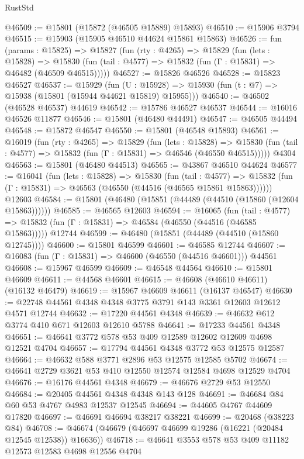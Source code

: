 \begin{lexlean}{RustStd}
\begin{coremodule}
@46509 := @15801 (@15872 (@46505 @15889) @15893)
@46510 := @15906 @3794
@46515 := @15903 (@15905 @46510 @44624 @15861 @15863)
@46526 := fun (params : @15825) =>
  @15827
    (fun (rty : @4265) =>
    @15829
      (fun (lets : @15828) =>
      @15830 (fun (tail : @4577) => @15832 (fun (Γ : @15831) => @46482 (@46509 @46515)))))
@46527 := @15826 @46526
@46528 := @15823 @46527
@46537 := @15929
    (fun (U : @15928) => @15930 (fun (t : @7) => @15938 (@15801 (@15944 @44621 @15819) @15955)))
@46540 := @46502 (@46528 @46537) @44619
@46542 := @15786 @46527 @46537
@46544 := @16016 @46526 @11877
@46546 := @15801 (@46480 @44491)
@46547 := @46505 @44494
@46548 := @15872 @46547
@46550 := @15801 (@46548 @15893)
@46561 := @16019
    (fun (rty : @4265) =>
    @15829
      (fun (lets : @15828) =>
      @15830 (fun (tail : @4577) => @15832 (fun (Γ : @15831) => @46546 (@46550 @46515)))))
    @4304
@46563 := @15801 (@46480 @44513)
@46565 := @43867 @46510 @44624
@46577 := @16041
    (fun (lets : @15828) =>
    @15830
      (fun (tail : @4577) =>
      @15832 (fun (Γ : @15831) => @46563 (@46550 (@44516 (@46565 @15861 @15863))))))
    @12603
@46584 := @15801 (@46480 (@15851 (@44489 (@44510 (@15860 (@12604 @15863))))))
@46585 := @46565 @12603
@46594 := @16065
    (fun (tail : @4577) => @15832 (fun (Γ : @15831) => @46584 (@46550 (@44516 (@46585 @15863)))))
    @12744
@46599 := @46480 (@15851 (@44489 (@44510 (@15860 @12745))))
@46600 := @15801 @46599
@46601 := @46585 @12744
@46607 := @16083 (fun (Γ : @15831) => @46600 (@46550 (@44516 @46601))) @44561
@46608 := @15967 @46599
@46609 := @46548 @44564
@46610 := @15801 @46609
@46611 := @44568 @46601
@46615 := @46608 (@46610 @46611) (@16132 @46479)
@46619 := @15967 @46609 @46611 (@16137 @46547)
@46630 := @22748 @44561 @4348 @4348 @3775 @3791 @143 @3361 @12603 @12612 @4571 @12744
@46632 := @17220 @44561 @4348
@46639 := @46632 @612 @3774 @410 @671 @12603 @12610 @5788
@46641 := @17233 @44561 @4348
@46651 := @46641 @3772 @578 @53 @409 @12589 @12602 @12609 @4698 @12521 @4704
@46657 := @17794 @44561 @4348 @3772 @53 @12575 @12587
@46664 := @46632 @588 @3771 @2896 @53 @12575 @12585 @5702
@46674 := @46641 @2729 @3621 @53 @410 @12550 @12574 @12584 @4698 @12529 @4704
@46676 := @16176 @44561 @4348
@46679 := @46676 @2729 @53 @12550
@46684 := @20405 @44561 @4348 @4348 @143 @128
@46691 := @46684 @84 @60 @53 @4767 @4983 @12537 @12545
@46694 := @44605 @4767 @44609 @17820
@46697 := @46691 @46694 @38217 @38221
@46699 := @20468 (@38223 @84)
@46708 := @46674 (@46679 (@46697 @46699 @19286 (@16221 (@20484 @12545 @12538)) @16636))
@46718 := @46641 @3553 @578 @53 @409 @11182 @12573 @12583 @4698 @12556 @4704

\end{coremodule}
\end{lexlean}
